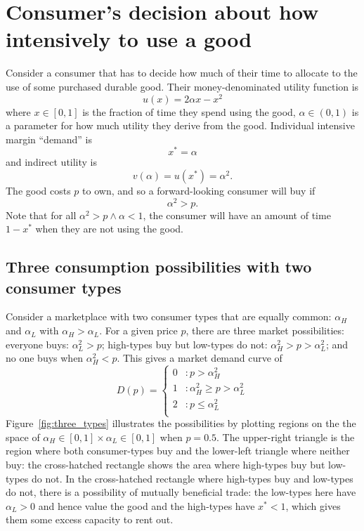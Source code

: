 \documentclass[11pt]{article}
\begin{document}
\section{Consumer's decision about how intensively to use a good} 
Consider a consumer that has to decide how much of their time to allocate to the use of some purchased durable good. 
Their money-denominated utility function is
\begin{equation}
u(x) = 2 \alpha x - x^2  
\end{equation} 
where $x \in [0,1]$ is the fraction of time they spend using the good, $\alpha \in (0,1)$ is a parameter for how much utility they derive from the good. 
Individual intensive margin ``demand'' is  
\begin{equation}
x^* = \alpha  
\end{equation} 
and indirect utility is 
\begin{equation}
v(\alpha) = u(x^*) = \alpha^2.  
\end{equation} 
The good costs $p$ to own, and so a forward-looking consumer will buy if 
\begin{equation} 
\alpha^2 > p. 
\end{equation} 
Note that for all $\alpha^2 > p \wedge \alpha < 1$, the consumer will have an amount of time $1 - x^*$ when they are not using the good.


\subsection{Three consumption possibilities with two consumer types} 
Consider a marketplace with two consumer types that are equally common: $\alpha_H$ and $\alpha_L$ with $\alpha_H > \alpha_L$. 
For a given price $p$, there are three market possibilities: 
everyone buys: $\alpha_L^2 > p$; high-types buy but low-types do not: $\alpha_H^2 > p > \alpha_L^2$; and no one buys when $\alpha_H^2 < p$. 
This gives a market demand curve of 
\begin{equation}
   D(p) = \left\{
     \begin{array}{ll}
       0 & : p > \alpha_H^2\\
       1 & : \alpha_H^2 \ge p > \alpha_L^2  \\
       2 & : p \le \alpha_L^2  \\
     \end{array}
   \right.
\end{equation} 
Figure~\ref{fig:three_types} illustrates the possibilities by plotting regions on the the space of $\alpha_H \in [0,1] \times \alpha_L \in [0,1]$ when $p = 0.5$.  
The upper-right triangle is the region where both consumer-types buy and the lower-left triangle where neither buy: 
the cross-hatched rectangle shows the area where high-types buy but low-types do not. 
In the cross-hatched rectangle where high-types buy and low-types do not, there is a possibility of mutually beneficial trade:
the low-types here have $\alpha_L > 0$ and hence value the good and the high-types have $x^* < 1$, which gives them some excess capacity to rent out. 
\end{document}
